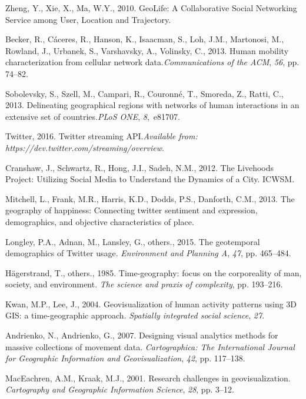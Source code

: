 \documentclass{elsart}
\begin{document}
\begin{thebibliography}{00}
Zheng, Y., Xie, X., Ma, W.Y., 2010. GeoLife: A Collaborative Social Networking Service among User, Location and Trajectory.

Becker, R., C{\'a}ceres, R., Hanson, K., Isaacman, S., Loh, J.M., Martonosi,
  M., Rowland, J., Urbanek, S., Varshavsky, A., Volinsky, C., 2013. Human mobility characterization from cellular network data.{\em Communications of the ACM}, {\em 56}, pp. 74--82.

Sobolevsky, S., Szell, M., Campari, R., Couronn{\'e}, T., Smoreda, Z., Ratti,
  C., 2013. Delineating geographical regions with networks of human interactions in an extensive set of countries.{\em PLoS ONE}, {\em 8},~e81707.

Twitter, 2016. Twitter streaming API.{\em Available from: https://dev.twitter.com/streaming/overview}.

Cranshaw, J., Schwartz, R., Hong, J.I., Sadeh, N.M., 2012. The Livehoods Project: Utilizing Social Media to Understand the Dynamics of a City. ICWSM.

Mitchell, L., Frank, M.R., Harris, K.D., Dodds, P.S., Danforth, C.M., 2013. The geography of happiness: Connecting twitter sentiment and expression, demographics, and objective characteristics of place.

Longley, P.A., Adnan, M., Lansley, G., others., 2015. The geotemporal demographics of Twitter usage. {\em Environment and Planning A}, {\em 47}, pp. 465--484.

H{\"a}gerstrand, T., others., 1985. Time-geography: focus on the corporeality of man, society, and environment. {\em The science and praxis of complexity}, pp. 193--216.

Kwan, M.P., Lee, J., 2004. Geovisualization of human activity patterns using 3D GIS: a time-geographic approach. {\em Spatially integrated social science}, {\em 27}.

Andrienko, N., Andrienko, G., 2007. Designing visual analytics methods for massive collections of movement data. {\em Cartographica: The International Journal for Geographic Information and Geovisualization}, {\em 42}, pp. 117--138.

MacEachren, A.M., Kraak, M.J., 2001. Research challenges in geovisualization. {\em Cartography and Geographic Information Science}, {\em
  28}, pp. 3--12.


\end{thebibliography}
\end{document}
